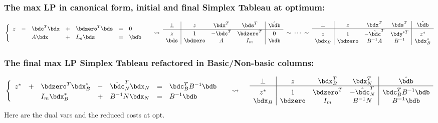 \documentclass[a4paper]{article}
\begin{document}
\subsubsection*{The max LP in canonical form, initial and final Simplex Tableau at optimum:}%
\[
  \begin{cases}
    \begin{array}[m]{*{5}{lc}}
    z &-& \bdc^T\bdx &+& \bdzero^T\bds &=&  0   \cr
      & &   A\bdx    &+&   I_m\bds     &=& \bdb \cr
    \end{array}
  \end{cases}
  \;\rightsquigarrow\;
    \begin{array}[m]{c|ccc|c}
 \perp &     z   & \bdx^T & \bds^T     & \hat\bdb \cr\hline\rule{0pt}{10pt}
    z  &     1   &-\bdc^T & \bdzero^T  &   0    \cr %
 \bds  & \bdzero & A      & I_m        & \bdb   \cr
    \end{array}
  \;\sim\;\cdots\;\sim\;
    \begin{array}[m]{c|ccc|c}
 \perp &     z   &     \bdx^T &     \bds^T   & \hat\bdb \cr\hline\rule{0pt}{10pt}
 z  &     1   &-\hat\bdc^T &     \bdy^{*T} & z^*\cr %
 \bdx_B& \bdzero &     B^{-1}A&     B^{-1}   & \bdx_B^*   \cr
    \end{array}
\]

\subsubsection*{The final max LP Simplex Tableau refactored in Basic/Non-basic columns:}%
\[
  \begin{cases}
    \begin{array}[m]{*{5}{lc}}
      z^* &+& \bdzero^T\bdx_B^* &-& \hat\bdc_N^T\bdx_N &=&  \bdc_B^TB^{-1}\bdb \cr
      & &    I_m\bdx_B^*  &+& B^{-1}N\bdx_N     &=& B^{-1}\bdb \cr
    \end{array}
  \end{cases}
  \;\rightsquigarrow\quad\;
    \begin{array}[m]{c|ccc|c}
   \perp &     z   & \bdx_B^T  & \bdx_N^T & \hat\bdb \cr\hline\rule{0pt}{10pt}
      z^*&     1   & \bdzero^T &-\hat\bdc_N^T & \bdc_B^TB^{-1}\bdb \cr %
  \bdx_B & \bdzero &  I_m  & B^{-1}N      &  B^{-1}\bdb   \cr
    \end{array}
\]
Here  are the dual vars and
 the reduced costs at opt.

\label{LastPageNo}
\end{document}
